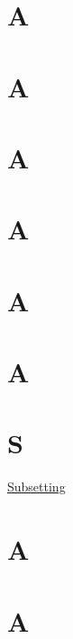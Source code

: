 \documentclass[]{book}
\begin{document}
\hypertarget{a-10}{%
\chapter*{A}\label{a-10}}

\hypertarget{a-11}{%
\chapter*{A}\label{a-11}}

\hypertarget{a-12}{%
\chapter*{A}\label{a-12}}

\hypertarget{a-13}{%
\chapter*{A}\label{a-13}}

\hypertarget{a-14}{%
\chapter*{A}\label{a-14}}

\hypertarget{a-15}{%
\chapter*{A}\label{a-15}}

\hypertarget{s}{%
\chapter*{S}\label{s}}

\href{https://linkedin-learning.pxf.io/rweekly_subset}{Subsetting}

\hypertarget{a-16}{%
\chapter*{A}\label{a-16}}

\hypertarget{a-17}{%
\chapter*{A}\label{a-17}}
\end{document}
